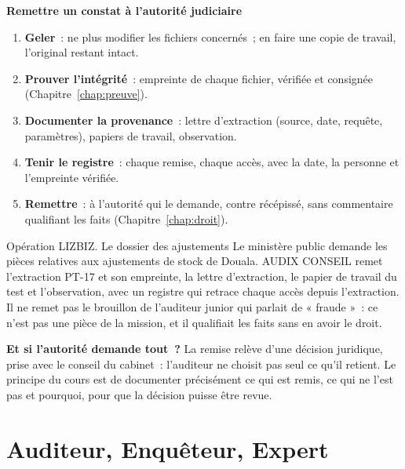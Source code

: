 \begin{boxprocedure}
\textbf{Remettre un constat à l'autorité judiciaire}
\begin{enumerate}
    \item \textbf{Geler}~: ne plus modifier les fichiers concernés~; en
          faire une copie de travail, l'original restant intact.
    \item \textbf{Prouver l'intégrité}~: empreinte de chaque fichier,
          vérifiée et consignée (Chapitre~\ref{chap:preuve}).
    \item \textbf{Documenter la provenance}~: lettre d'extraction (source,
          date, requête, paramètres), papiers de travail, observation.
    \item \textbf{Tenir le registre}~: chaque remise, chaque accès, avec la
          date, la personne et l'empreinte vérifiée.
    \item \textbf{Remettre}~: à l'autorité qui le demande, contre récépissé,
          sans commentaire qualifiant les faits (Chapitre~\ref{chap:droit}).
\end{enumerate}
\end{boxprocedure}

\begin{boxscenario}{Opération LIZBIZ. Le dossier des ajustements}
Le ministère public demande les pièces relatives aux ajustements de stock
de Douala. AUDIX CONSEIL remet l'extraction PT-17 et son empreinte, la
lettre d'extraction, le papier de travail du test et l'observation, avec
un registre qui retrace chaque accès depuis l'extraction. Il ne remet pas
le brouillon de l'auditeur junior qui parlait de « fraude »~: ce n'est
pas une pièce de la mission, et il qualifiait les faits sans en avoir
le droit.
\end{boxscenario}

\begin{boxinfo}
\textbf{Et si l'autorité demande tout~?} La remise relève d'une décision
juridique, prise avec le conseil du cabinet~: l'auditeur ne choisit pas
seul ce qu'il retient. Le principe du cours est de documenter précisément
ce qui est remis, ce qui ne l'est pas et pourquoi, pour que la décision
puisse être revue.
\end{boxinfo}

\section{Auditeur, Enquêteur, Expert}
\label{sec:c29-roles}

